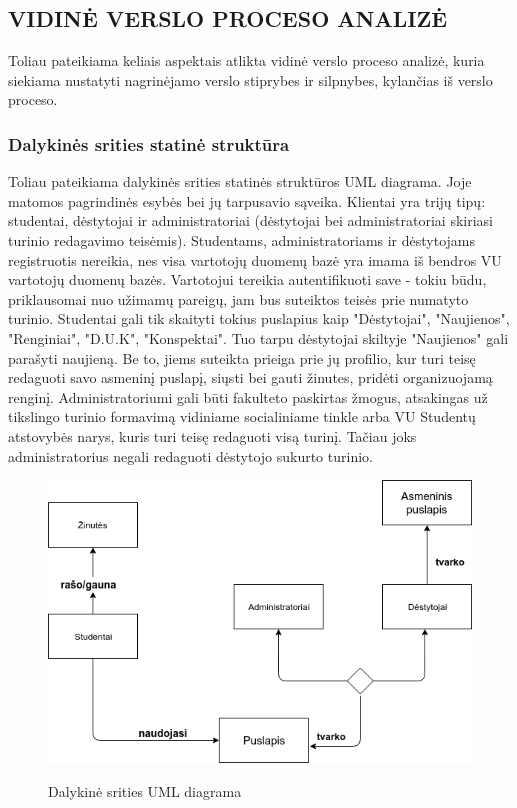 \documentclass{VUMIFPSkursinis}
\begin{document}
\subsection{VIDINĖ VERSLO PROCESO ANALIZĖ}
Toliau pateikiama keliais aspektais atlikta vidinė verslo proceso analizė, kuria siekiama
nustatyti nagrinėjamo verslo stiprybes ir silpnybes, kylančias iš verslo proceso.

\subsubsection{Dalykinės srities statinė struktūra}
 Toliau pateikiama dalykinės srities statinės struktūros UML diagrama. Joje matomos pagrindinės esybės bei jų tarpusavio sąveika. Klientai yra trijų tipų: studentai, dėstytojai ir administratoriai (dėstytojai bei administratoriai skiriasi turinio redagavimo teisėmis). Studentams, administratoriams ir dėstytojams registruotis nereikia, nes visa vartotojų duomenų bazė yra imama iš bendros VU vartotojų duomenų bazės. Vartotojui tereikia autentifikuoti save - tokiu būdu, priklausomai nuo užimamų pareigų, jam bus suteiktos teisės prie numatyto turinio. Studentai gali tik skaityti tokius puslapius kaip "Dėstytojai", "Naujienos", "Renginiai", "D.U.K", "Konspektai". Tuo tarpu dėstytojai skiltyje "Naujienos" gali parašyti naujieną. Be to, jiems suteikta prieiga prie jų profilio, kur turi teisę redaguoti savo asmeninį puslapį, siųsti bei gauti žinutes, pridėti organizuojamą renginį. Administratoriumi gali būti fakulteto paskirtas žmogus, atsakingas už tikslingo turinio formavimą vidiniame socialiniame tinkle arba VU Studentų atstovybės narys, kuris turi teisę redaguoti visą turinį. Tačiau joks administratorius negali redaguoti dėstytojo sukurto turinio.\\

\begin{figure}[H]
\centering
\includegraphics[width=\linewidth]{img/dalykine.png}
\label{fig:dalykine}
\caption{Dalykinė srities UML diagrama}
\end{figure}
\end{document}
